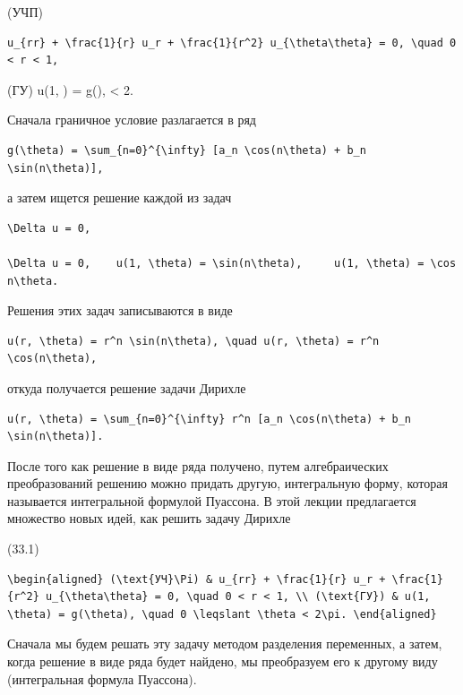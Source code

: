 \documentclass[
  ukrainian,
]{article}
\begin{document}
(УЧП)

\begin{verbatim}
u_{rr} + \frac{1}{r} u_r + \frac{1}{r^2} u_{\theta\theta} = 0, \quad 0 < r < 1,
\end{verbatim}

(ГУ) u(1, \theta) = g(\theta),  \le \theta \textless{} 2\pi.

Сначала граничное условие разлагается в ряд

\begin{verbatim}
g(\theta) = \sum_{n=0}^{\infty} [a_n \cos(n\theta) + b_n \sin(n\theta)],
\end{verbatim}

а затем ищется решение каждой из задач

\begin{verbatim}
\Delta u = 0,

\Delta u = 0,    u(1, \theta) = \sin(n\theta),     u(1, \theta) = \cos n\theta.
\end{verbatim}

Решения этих задач записываются в виде

\begin{verbatim}
u(r, \theta) = r^n \sin(n\theta), \quad u(r, \theta) = r^n \cos(n\theta),
\end{verbatim}

откуда получается решение задачи Дирихле

\begin{verbatim}
u(r, \theta) = \sum_{n=0}^{\infty} r^n [a_n \cos(n\theta) + b_n \sin(n\theta)].
\end{verbatim}

После того как решение в виде ряда получено, путем алгебраических
преобразований решению можно придать другую, интегральную форму, которая
называется интегральной формулой Пуассона. В этой лекции предлагается
множество новых идей, как решить задачу Дирихле

(33.1)

\begin{verbatim}
\begin{aligned} (\text{УЧ}\Pi) & u_{rr} + \frac{1}{r} u_r + \frac{1}{r^2} u_{\theta\theta} = 0, \quad 0 < r < 1, \\ (\text{ГУ}) & u(1, \theta) = g(\theta), \quad 0 \leqslant \theta < 2\pi. \end{aligned}
\end{verbatim}

Сначала мы будем решать эту задачу методом разделения переменных, а
затем, когда решение в виде ряда будет найдено, мы преобразуем его к
другому виду (интегральная формула Пуассона).
\end{document}
